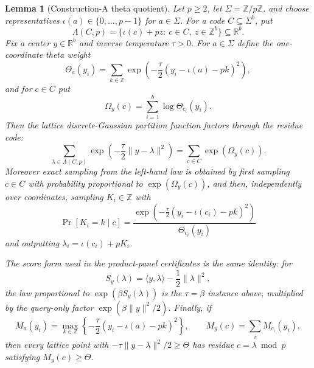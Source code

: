 \documentclass[10pt]{article}
\newtheorem{lemma}[theorem]{Lemma}
\theoremstyle{definition}
\newcommand{\ip}[2]{\langle #1,#2\rangle}
\begin{document}
\begin{lemma}[Construction-A theta quotient]
   \label{lem:construction-a-theta-quotient}
   Let \(p\ge2\), let \(\Sigma=\mathbb Z/p\mathbb Z\), and choose representatives
   \(\iota(a)\in\{0,\ldots,p-1\}\) for \(a\in\Sigma\).  For a code
   \(C\subseteq\Sigma^b\), put
   \[
      \Lambda(C,p)
      =
      \{\iota(c)+pz:\ c\in C,\ z\in\mathbb Z^b\}\subseteq\mathbb R^b .
   \]
   Fix a center \(y\in\mathbb R^b\) and inverse temperature \(\tau>0\).  For
   \(a\in\Sigma\) define the one-coordinate theta weight
   \[
      \Theta_a(y_i)
      =
      \sum_{k\in\mathbb Z}
      \exp\!\left(
         -\frac{\tau}{2}(y_i-\iota(a)-pk)^2
      \right),
   \]
   and for \(c\in C\) put
   \[
      \Omega_y(c)=\sum_{i=1}^b\log\Theta_{c_i}(y_i).
   \]
   Then the lattice discrete-Gaussian partition function factors through the
   residue code:
   \[
      \sum_{\lambda\in\Lambda(C,p)}
      \exp\!\left(-\frac{\tau}{2}\|y-\lambda\|^2\right)
      =
      \sum_{c\in C}\exp(\Omega_y(c)).
      \tag{CA1}
   \]
   Moreover exact sampling from the left-hand law is obtained by first sampling
   \(c\in C\) with probability proportional to \(\exp(\Omega_y(c))\), and then,
   independently over coordinates, sampling \(K_i\in\mathbb Z\) with
   \[
      \Pr[K_i=k\mid c]
      =
      \frac{
         \exp\!\left(
            -\frac{\tau}{2}(y_i-\iota(c_i)-pk)^2
         \right)}
      {\Theta_{c_i}(y_i)}
   \]
   and outputting \(\lambda_i=\iota(c_i)+pK_i\).

   The score form used in the product-panel certificates is the same identity:
   for
   \[
      S_y(\lambda)=\ip{y}{\lambda}-\frac12\|\lambda\|^2,
   \]
   the law proportional to \(\exp(\beta S_y(\lambda))\) is the
   \(\tau=\beta\) instance above, multiplied by the query-only factor
   \(\exp(\beta\|y\|^2/2)\).  Finally, if
   \[
      M_a(y_i)=
      \max_{k\in\mathbb Z}
      \left\{-\frac{\tau}{2}(y_i-\iota(a)-pk)^2\right\},
      \qquad
      M_y(c)=\sum_iM_{c_i}(y_i),
   \]
   then every lattice point with
   \(-\tau\|y-\lambda\|^2/2\ge\Theta\) has residue \(c=\lambda\bmod p\)
   satisfying \(M_y(c)\ge\Theta\).
\end{lemma}
\end{document}
